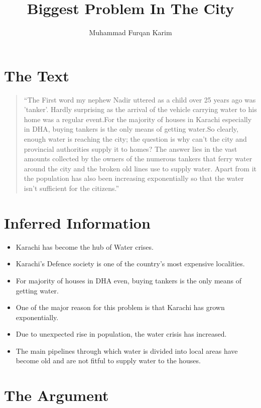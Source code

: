 \documentclass{article}
\title{Biggest Problem In The City}  %
\author{Muhammad Furqan Karim} %
\begin{document}
\maketitle

\section{The Text}

\begin{quotation}
  ``The First word my nephew Nadir uttered as a child over 25 years ago was 'tanker'. Hardly surprising as the arrival of the vehicle carrying water to his home was a regular event.For the majority of houses in Karachi especially in DHA, buying tankers is the only means of getting water.So clearly, enough water is reaching the city; the question is why can’t the city and provincial authorities supply it to homes? The answer lies in the vast amounts collected by the owners of the numerous tankers that ferry water around the city and the broken old lines use to supply water. Apart from it the population has also been increasing exponentially so that the water isn't sufficient for the citizens.''
\end{quotation}


\section{Inferred Information}

\begin{itemize}
\item Karachi has become the hub of Water crises.
\item Karachi's Defence society is one of the country's most expensive localities.
\item For majority of houses in DHA even, buying tankers is the only means of getting water.
\item One of the major reason for this problem is that Karachi has grown exponentially.
\item Due to unexpected rise in population, the water crisis has increased.
\item The main pipelines through which water is divided into local areas have become old and are not fitful to supply water to the houses.
\end{itemize}

\section{The Argument}
\end{document}
